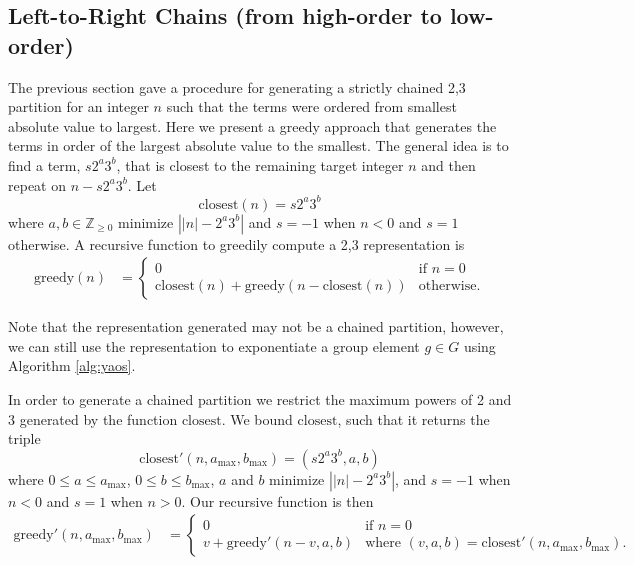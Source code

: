 \documentclass{ucalgthes1}
\theoremstyle{plain}
\theoremstyle{definition}
\newcommand{\ZZgez}{\mathbb{Z}_{\ge 0}}
\newcommand{\amax}{a_\textrm{max}}
\newcommand{\bmax}{b_\textrm{max}}
\begin{document}
\bigbreak
\subsection{Left-to-Right Chains (from high-order to low-order)}

\newcommand{\greedyltor}{\textrm{greedy}}
\newcommand{\greedychain}{\textrm{greedy}'}
\newcommand{\greedybound}{\textrm{greedy}''}
\newcommand{\closest}{\textrm{closest}}

The previous section gave a procedure for generating a strictly chained 2,3 partition for an integer $n$ such that the terms were ordered from smallest absolute value to largest.  Here we present a greedy approach that generates the terms in order of the largest absolute value to the smallest. The general idea is to find a term, $s2^a3^b$, that is closest to the remaining target integer $n$ and then repeat on $n - s2^a3^b$. Let
\[
\closest(n) = s2^a3^b
\]
where $a,b \in \ZZgez$ minimize $\left| |n| - 2^a3^b \right|$ and $s = -1$ when $n < 0$ and $s = 1$ otherwise. A recursive function to greedily compute a 2,3 representation is
\begin{align*}
\greedyltor(n) &= \begin{cases}
              0 & \textrm{if $n = 0$} \\
              \closest(n) + \greedyltor(n - \closest(n)) & \textrm{otherwise}.
          \end{cases}
\end{align*}

\noindent
Note that the representation generated may not be a chained partition, however, we can still use the representation to exponentiate a group element $g \in G$ using Algorithm \ref{alg:yaos}.

In order to generate a chained partition we restrict the maximum powers of 2 and 3 generated by the function $\closest$.  We bound $\closest$, such that it returns the triple
\[
\closest'(n, \amax, \bmax) = (s2^a3^b, a, b)
\]
where $0 \le a \le \amax$, $0 \le b \le \bmax$, $a$ and $b$ minimize $\left| |n| - 2^a3^b \right|$, and $s=-1$ when $n < 0$ and $s=1$ when $n > 0$. Our recursive function is then
\begin{align*}
\greedychain(n, \amax, \bmax) &= \begin{cases}
        0 & \textrm{if $n = 0$} \\
        v + \greedychain(n - v, a, b) & \textrm{where $(v, a, b) = \closest'(n, \amax, \bmax)$}.
    \end{cases}
\end{align*}
\end{document}
